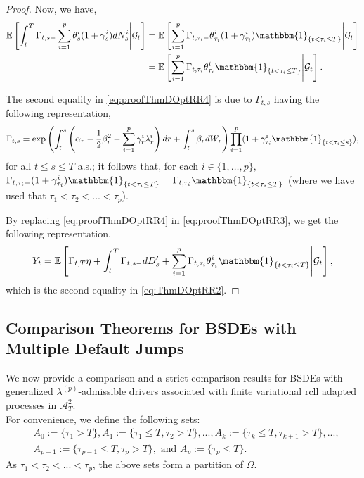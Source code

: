\documentclass[11pt,a4paper]{article}
\numberwithin{equation}{section}
\theoremstyle{newPlain}
\theoremstyle{newDefinition}
\theoremstyle{newRemark}
\begin{document}
{\begin{proof}
    Now, we have,
    \begin{align}\label{eq:proofThmDOptRR4}
        \begin{aligned}
            \mathbb{E}\left[\int_t^T\Gamma_{t,s-}\sum_{i=1}^p\theta_s^i(1+\gamma_s^i)dN_s^i\middle|\mathcal{G}_t\right] &= \mathbb{E}\left[\sum_{i=1}^p\Gamma_{t,\tau_i-}\theta_{\tau_i}^i(1+\gamma_{\tau_i}^i)\mathbbm{1}_{\{t<\tau_i\le T\}}\middle|\mathcal{G}_t\right]\\
            &=\mathbb{E}\left[\sum_{i=1}^p\Gamma_{t,\tau_i}\theta_{\tau_i}^i\mathbbm{1}_{\{t<\tau_i\le T\}}\middle|\mathcal{G}_t\right].
        \end{aligned}
    \end{align}

    The second equality in \eqref{eq:proofThmDOptRR4} is due to $\Gamma_{t,s}$ having the following representation,
    \begin{align*}
        \Gamma_{t,s} = \exp\left(\int_t^s\left(\alpha_r-\frac{1}{2}\beta_r^2-\sum_{i=1}^p\gamma_r^i\lambda_r^i\right)dr+\int_t^s\beta_rdW_r\right)\prod_{i=1}^p(1+\gamma_{\tau_i}^i\mathbbm{1}_{\{t<\tau_i\le s\}}),
    \end{align*}
 	for all $t\le s\le T$ a.s.;  it follows that, for each $i\in\{1,\ldots,p\},$ $\Gamma_{t,\tau_i-}(1+\gamma_{\tau_i}^i)\mathbbm{1}_{\{t<\tau_i\le T\}} = \Gamma_{t,\tau_i}\mathbbm{1}_{\{t<\tau_i\le T\}}$ (where we have used that $\tau_1<\tau_2<...<\tau_p$).  

    By replacing \eqref{eq:proofThmDOptRR4} in \eqref{eq:proofThmDOptRR3}, we get the following representation,
    \begin{equation*}
        Y_t = \mathbb{E}\left[\Gamma_{t,T}\eta + \int_t^T\Gamma_{t,s-}dD_s' + \sum_{i=1}^p\Gamma_{t,\tau_i}\theta_{\tau_i}^i\mathbbm{1}_{\{t<\tau_i\le T\}}\middle|\mathcal{G}_t\right],
    \end{equation*}
    which is the second equality in \eqref{eq:ThmDOptRR2}.
\end{proof}

\subsection{Comparison Theorems for BSDEs with Multiple Default Jumps}\label{subsection_comparison}

We now provide a comparison and a strict comparison results for BSDEs with generalized $\lambda^{(p)}$-admissible drivers associated with finite variational rcll adapted processes in $\mathcal{A}_T^2$.  \\
For convenience, we define the following sets:
\begin{equation} \label{sets}
\begin{aligned}
&A_0:=\{\tau_1>T\}, A_1:=\{\tau_1\leq T,\tau_2>T\},..., A_k:=\{\tau_k\leq T,\tau_{k+1}> T\},...,\\
&A_{p-1}:=\{\tau_{p-1}\leq T,\tau_{p}> T\}, \text { and } A_p:=\{\tau_{p}\leq T\}.
\end{aligned}
\end{equation}
 As $\tau_1<\tau_2<...<\tau_p$, the above sets  form a partition of $\Omega$.


}
\end{document}
